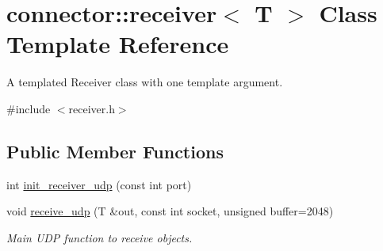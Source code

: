 \hypertarget{classconnector_1_1receiver}{}\section{connector\+:\+:receiver$<$ T $>$ Class Template Reference}
\label{classconnector_1_1receiver}


A templated Receiver class with one template argument.  




{\ttfamily \#include $<$receiver.\+h$>$}

\subsection*{Public Member Functions}
\begin{DoxyCompactItemize}
\item 
int \hyperlink{classconnector_1_1receiver_a2c83b4a01edfa35dffe0cbe4556af0af}{init\+\_\+receiver\+\_\+udp} (const int port)
\item 
void \hyperlink{classconnector_1_1receiver_a05983ed90a0b8e1d031a67eb190230ce}{receive\+\_\+udp} (T \&out, const int socket, unsigned buffer=2048)
\begin{DoxyCompactList}\small\item\em Main U\+DP function to receive objects. \end{DoxyCompactList}\end{DoxyCompactItemize}
